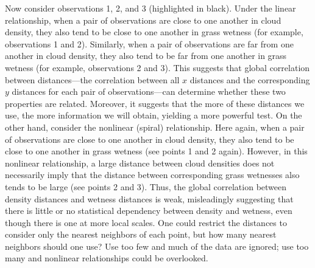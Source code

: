 \documentclass[11pt]{article}
\begin{document}
Now consider observations  1, 2, and 3 (highlighted in black).  Under the linear relationship, when a pair of observations are close to one another in cloud density, they  also tend to be close to one another in grass wetness (for example, observations 1 and 2).
Similarly, %
when a pair of observations are far from one another in cloud density, they also tend to be far from one another in grass wetness (for example, observations 2 and 3).  
This suggests that global correlation between distances---the correlation between all $x$ distances and the corresponding $y$ distances for each pair of observations---can determine whether these two properties are related.  
Moreover, it suggests that the more of these distances we use, the more information we will obtain, yielding a more powerful test.
% 
On the other hand, consider the nonlinear (spiral) relationship.  Here again, when a pair of observations are close to one another in cloud density, they also tend to be close to one another in grass wetness (see points 1 and 2 again).  However, in this nonlinear relationship,  a large distance between cloud densities does not necessarily imply that the distance between corresponding grass wetnesses also tends to be large (see points 2 and 3).
Thus, the global correlation between density distances and wetness distances is weak, misleadingly suggesting that there is little or no statistical dependency between density and wetness, even though there is one at more local scales.
One could restrict the distances to consider only the nearest neighbors of each point, but how many nearest neighbors should one use?  Use too few and much of the data are ignored; use too many and nonlinear relationships could be overlooked. 
  
\end{document}
